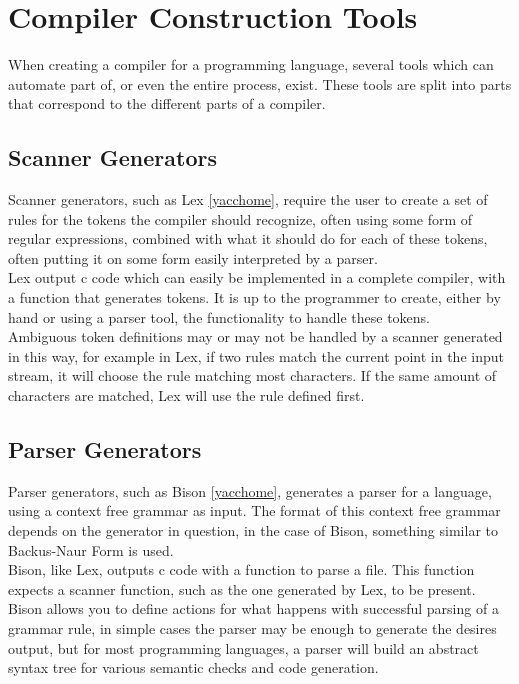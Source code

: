 \section{Compiler Construction Tools}

  When creating a compiler for a programming language, several tools which can automate part
  of, or even the entire process, exist. These tools are split into parts that correspond to 
  the different parts of a compiler.
  
  \subsection{Scanner Generators}
  
    Scanner generators, such as Lex \ref{yacchome}, require the user to create a set of rules
    for the tokens the compiler should recognize, often using some form of regular expressions,
    combined with what it should do for each of these tokens, often putting it on some form
    easily interpreted by a parser.
    \\
    Lex output c code which can easily be implemented in a complete compiler, with a function that
    generates tokens. It is up to the programmer to create, either by hand or using a parser
    tool, the functionality to handle these tokens.
    \\
    Ambiguous token definitions may or may not be handled by a scanner generated in this way,
    for example in Lex, if two rules match the current point in the input stream, it will
    choose the rule matching most characters. If the same amount of characters are matched,
    Lex will use the rule defined first.
    
  \subsection{Parser Generators}
    
    Parser generators, such as Bison \ref{yacchome}, generates a parser for a language, using a
    context free grammar as input. The format of this context free grammar depends on the
    generator in question, in the case of Bison, something similar to Backus-Naur Form is used.
    \\
    Bison, like Lex, outputs c code with a function to parse a file. This function expects a
    scanner function, such as the one generated by Lex, to be present. Bison allows you to define
    actions for what happens with successful parsing of a grammar rule, in simple cases the parser
    may be enough to generate the desires output, but for most programming languages, a parser will
    build an abstract syntax tree for various semantic checks and code generation.
    
